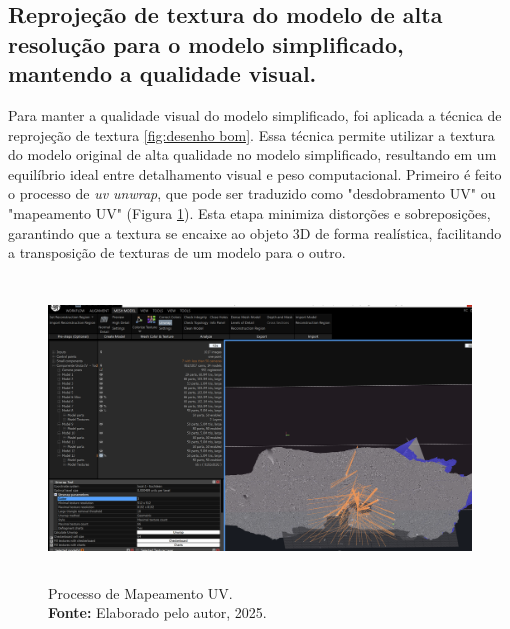   \subsection{Reprojeção de textura do modelo de alta resolução para o modelo simplificado, mantendo a qualidade visual.} 
  
Para manter a qualidade visual do modelo simplificado, foi aplicada a técnica de reprojeção de textura \ref{fig:desenho bom}. Essa técnica permite utilizar a textura do modelo original de alta qualidade no modelo simplificado, resultando em um equilíbrio ideal entre detalhamento visual e peso computacional. Primeiro é feito o processo de \textit{ uv unwrap}, que pode ser traduzido como "desdobramento UV" ou "mapeamento UV" (Figura \ref{fig:unwrap}). Esta etapa minimiza distorções e sobreposições, garantindo que a textura se encaixe ao objeto 3D de forma realística, facilitando a transposição de texturas de um modelo para o outro. 
\begin{figure}[H]
        \includegraphics[height=8cm, keepaspectratio]{img/reality e fotogrametria processo/unwrap.png}
        \caption{Processo de Mapeamento UV. \\
            \textbf{Fonte:} Elaborado pelo autor, 2025.}
        \label{fig:unwrap}
\end{figure}

